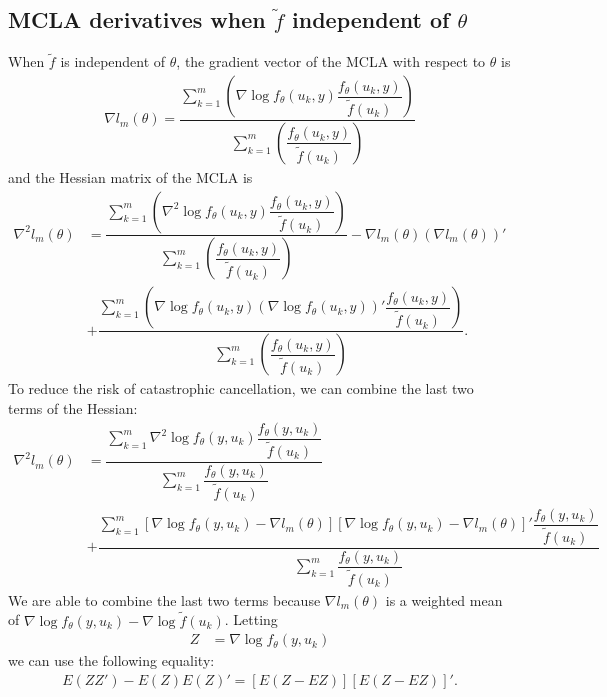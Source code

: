 \documentclass{article}
\begin{document}
\subsection{MCLA derivatives when $\tilde{f}$ independent of $\theta$}\label{sec:calcsindep}

When $\tilde{f}$ is independent of $\theta$, the gradient vector of the MCLA with respect to $\theta$ is
\begin{align}
\nabla l_m(\theta)= \dfrac{\sum_{k=1}^m    \left( \nabla \log f_\theta(u_k,y)  \dfrac{f_\theta(u_k,y)   }{\tilde{f}(u_k)}\right) }{\sum_{k=1}^m \left( \dfrac{f_\theta(u_k,y)}{\tilde{f}(u_k)} \right) } 
\end{align}
and the Hessian matrix of the MCLA is
\begin{align}
\nabla^2 l_m(\theta)&= \dfrac{\sum_{k=1}^m    \left( \nabla^2 \log f_\theta(u_k,y)   \dfrac{f_\theta(u_k,y)}{\tilde{f}(u_k)} \right)}{\sum_{k=1}^m \left( \dfrac{f_\theta(u_k,y)}{\tilde{f}(u_k)} \right) }- \nabla l_m(\theta) (\nabla l_m(\theta) )'  \\
&+\dfrac{\sum_{k=1}^m    \left( \nabla \log f_\theta(u_k,y) (\nabla \log f_\theta(u_k,y))'   \dfrac{f_\theta(u_k,y)}{\tilde{f}(u_k)} \right)}{\sum_{k=1}^m \left( \dfrac{f_\theta(u_k,y)}{\tilde{f}(u_k)} \right) }.
\end{align}
To reduce the risk of catastrophic cancellation, we can combine the last two terms of the Hessian:
\begin{align}
\nabla^2 l_m(\theta)&= \dfrac{   \sum_{k=1}^m  \nabla^2 \log f_\theta(y,u_k)       \dfrac{ f_\theta(y,u_k)}{\tilde{f}(u_k)}  }{\sum_{k=1}^m  \dfrac{ f_\theta(y,u_k)   }{\tilde{f}(u_k)}}\\
&+ \dfrac{   \sum_{k=1}^m \left[ \nabla \log f_\theta(y,u_k)   - \nabla l_m(\theta)   \right] \left[ \nabla \log f_\theta(y,u_k)  - \nabla l_m(\theta)  \right]'  \dfrac{ f_\theta(y,u_k)   }{\tilde{f}(u_k)}   }{\sum_{k=1}^m  \dfrac{ f_\theta(y,u_k)   }{\tilde{f}(u_k)}}
\end{align}
We are able to combine the last two terms because $\nabla l_m(\theta)$ is a weighted mean of $\nabla \log f_\theta (y,u_k)- \nabla \log \tilde{f}(u_k)$. Letting
\begin{align}
Z&=\nabla \log f_\theta (y,u_k)
\end{align}
 we can use the following equality:
\begin{align}
E(ZZ')-E(Z)E(Z)' = \left[ E(Z-EZ)  \right]\left[ E(Z-EZ)  \right]'.
\end{align}
\end{document}
